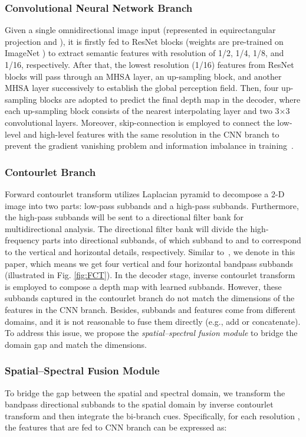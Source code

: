 \documentclass[10pt,times,mathptm,psfig,twocolumn,journals]{IEEEtran}
\begin{document}
\subsubsection{Convolutional Neural Network Branch }
\label{CNNbranch}
Given a single omnidirectional image input  (represented in equirectangular projection and ), it is firstly fed to ResNet \cite{he2016identity} blocks (weights are pre-trained on ImageNet \cite{he2019rethinking}) to extract semantic features with resolution of 1/2, 1/4, 1/8, and 1/16, respectively. After that, the lowest resolution (1/16) features from ResNet blocks will pass through an MHSA layer, an up-sampling block, and another MHSA layer \cite{wang2018non} successively to establish the global perception field. Then, four up-sampling blocks are adopted to predict the final depth map in the decoder, where each up-sampling block \cite{ramamonjisoa2021single, huang2018condensenet} consists of the nearest interpolating layer and two 3×3 convolutional layers.
Moreover, skip-connection is employed to connect the low-level and high-level features with the same resolution in the CNN branch to prevent the gradient vanishing problem and information imbalance in training~\cite{ronneberger2015u}. \subsubsection{Contourlet Branch}
\label{contourletbranch}
Forward contourlet transform utilizes Laplacian pyramid to decompose a 2-D image into two parts: low-pass subbands and a high-pass subbands. Furthermore, the high-pass subbands will be sent to a directional filter bank for multidirectional analysis.  The directional filter bank will divide the high-frequency parts into  directional subbands, of which subband  to  and  to  correspond to the vertical and horizontal details, respectively. Similar to~\cite{MengkunLiu2021CCNNCC}, we denote  in this paper, which means we get four vertical and four horizontal bandpass subbands (illustrated in Fig. \ref{fig:FCT}). In the decoder stage, inverse contourlet transform is employed to compose a depth map with learned subbands. However, these subbands captured in the contourlet branch do not match the dimensions of the features in the CNN branch. Besides, subbands and features come from different domains, and it is not reasonable to fuse them directly (e.g., add or concatenate). To address this issue, we propose the \textit{spatial–spectral fusion module} to bridge the domain gap and match the dimensions.
\subsubsection{Spatial–Spectral Fusion Module}
\label{SSFM}
To bridge the gap between the spatial and spectral domain, we transform the bandpass directional subbands to the spatial domain by inverse contourlet transform and then integrate the bi-branch cues. Specifically, for each resolution , the features  that are fed to CNN branch can be expressed as:
\end{document}
